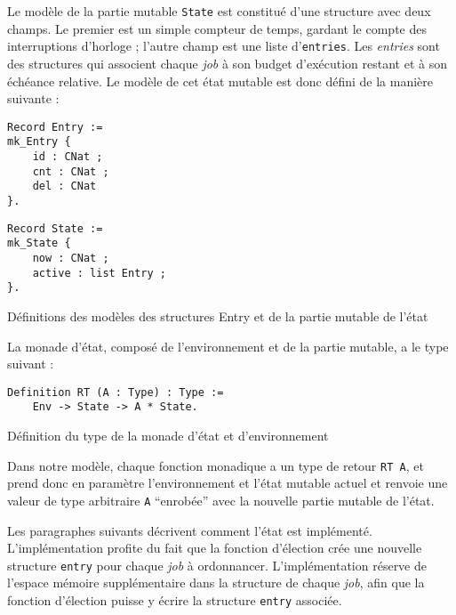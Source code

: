 	Le modèle de la partie mutable \texttt{State} est constitué d'une structure avec deux champs. Le premier est un simple compteur de temps, gardant le compte des interruptions d'horloge ; l'autre champ est une liste d'\texttt{entries}. Les \emph{entries} sont des structures qui associent chaque \emph{job} à son budget d'exécution restant et à son échéance relative. Le modèle de cet état mutable est donc défini de la manière suivante :
\begin{listing}[ht]
\begin{minipage}[c]{0.50\linewidth}
\begin{verbatim}
Record Entry :=
mk_Entry {
    id : CNat ;
    cnt : CNat ;
    del : CNat
}.
\end{verbatim}
\end{minipage}
\begin{minipage}[c]{0.50\linewidth}
\begin{verbatim}
Record State :=                     
mk_State {                      
    now : CNat ;                 
    active : list Entry ;
}.

\end{verbatim}
\end{minipage}
\caption{Définitions des modèles des structures Entry et de la partie mutable de l'état}
\label{code:entry_state_definition}
\end{listing}

	La monade d'état, composé de l'environnement et de la partie mutable, a le type suivant :
\begin{listing}[ht]
	\begin{verbatim}
Definition RT (A : Type) : Type :=
    Env -> State -> A * State.
	\end{verbatim}
	\caption{Définition du type de la monade d'état et d'environnement}
	\label{code:monad_type}
\end{listing}
	Dans notre modèle, chaque fonction monadique a un type de retour \texttt{RT A}, et prend donc en paramètre l'environnement et l'état mutable actuel et renvoie une valeur de type arbitraire \texttt{A} ``enrobée'' avec la nouvelle partie mutable de l'état.

	Les paragraphes suivants décrivent comment l'état est implémenté.
	L'implémentation profite du fait que la fonction d'élection crée une nouvelle structure \texttt{entry} pour chaque \emph{job} à ordonnancer. L'implémentation réserve de l'espace mémoire supplémentaire dans la structure de chaque \emph{job}, afin que la fonction d'élection puisse y écrire la structure \texttt{entry} associée.

